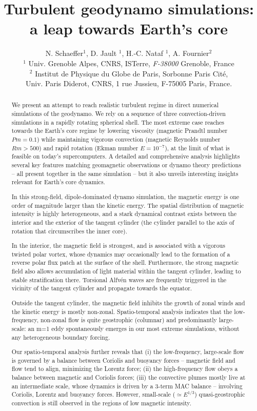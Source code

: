 \documentclass[12pt, a4paper]{article}
\title{Turbulent geodynamo simulations: a leap towards Earth's core}
\author{N. Schaeffer$^1$, D. Jault $^1$, H.-C. Nataf $^1$, A. Fournier$^2$\\[0.5cm]
 \small $^1$ Univ. Grenoble Alpes, CNRS, ISTerre, \emph{F-38000} Grenoble, France \\
 \small $^2$ Institut de Physique du Globe de Paris, Sorbonne Paris Cit\'e,\\ \small Univ. Paris Diderot, CNRS, 1 rue Jussieu, F-75005 Paris, France.}
\begin{document}
\maketitle


\begin{abstract}
We present an attempt to reach realistic turbulent regime in direct numerical simulations of the geodynamo.
We rely on a sequence of three convection-driven simulations in a rapidly rotating spherical shell.
The most extreme case reaches towards the Earth's core regime by lowering viscosity (magnetic Prandtl number $Pm = 0.1$) while maintaining vigorous convection (magnetic Reynolds number $Rm > 500$) and rapid rotation (Ekman number $E=10^{-7}$), at the limit of what is feasible on today's supercomputers.
A detailed and comprehensive analysis highlights several key features matching geomagnetic observations or dynamo theory predictions -- all present together in the same simulation -- but it also unveils interesting insights relevant for Earth's core dynamics.

In this strong-field, dipole-dominated dynamo simulation, the magnetic energy is one order of magnitude larger than the kinetic energy.
The spatial distribution of magnetic intensity is highly heterogeneous, and a stark dynamical contrast exists between the interior and the exterior of the tangent cylinder (the cylinder parallel to the axis of rotation that circumscribes the inner core).

In the interior, the magnetic field is strongest, and is associated with a vigorous twisted polar vortex, whose dynamics may occasionally lead to the formation of a reverse polar flux patch at the surface of the shell.
Furthermore, the strong magnetic field also allows accumulation of light material within the tangent cylinder, leading to stable stratification there.
Torsional Alfvén waves are frequently triggered in the vicinity of the tangent cylinder and propagate towards the equator.

Outside the tangent cylinder, the magnetic field inhibits the growth of zonal winds and the kinetic energy is mostly non-zonal.
Spatio-temporal analysis indicates that the low-frequency, non-zonal flow is quite geostrophic (columnar) and predominantly large-scale: an m=1 eddy spontaneously emerges in our most extreme simulations, without any heterogeneous boundary forcing.

Our spatio-temporal analysis further reveals that
(i) the low-frequency, large-scale flow is governed by a balance between Coriolis and buoyancy forces -- magnetic field and flow tend to align, minimizing the Lorentz force;
(ii) the high-frequency flow obeys a balance between magnetic and Coriolis forces;
(iii) the convective plumes mostly live at an intermediate scale, whose dynamics is driven by a 3-term MAC balance -- involving Coriolis, Lorentz and buoyancy forces.
However, small-scale ($\simeq E^{1/3}$) quasi-geostrophic convection is still observed in the regions of low magnetic intensity.

\end{abstract}
\end{document}
